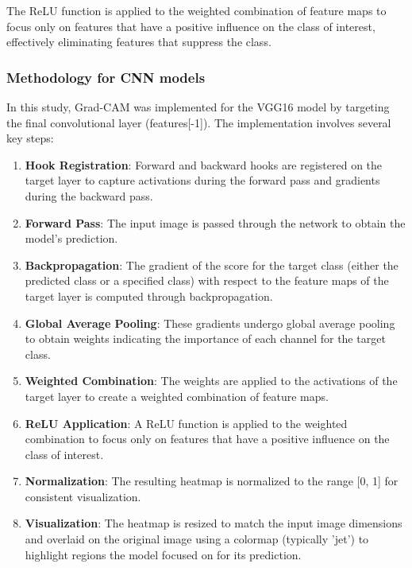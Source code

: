\documentclass[a4paper,12pt]{report}
\begin{document}
The ReLU function is applied to the weighted combination of feature maps to focus only on features that have a positive influence on the class of interest, effectively eliminating features that suppress the class.

\subsubsection{Methodology for CNN models}

In this study, Grad-CAM was implemented for the VGG16 model by targeting the final convolutional layer (features[-1]). The implementation involves several key steps:

\begin{enumerate}
    \item \textbf{Hook Registration}: Forward and backward hooks are registered on the target layer to capture activations during the forward pass and gradients during the backward pass.
    
    \item \textbf{Forward Pass}: The input image is passed through the network to obtain the model's prediction.
    
    \item \textbf{Backpropagation}: The gradient of the score for the target class (either the predicted class or a specified class) with respect to the feature maps of the target layer is computed through backpropagation.
    
    \item \textbf{Global Average Pooling}: These gradients undergo global average pooling to obtain weights indicating the importance of each channel for the target class.
    
    \item \textbf{Weighted Combination}: The weights are applied to the activations of the target layer to create a weighted combination of feature maps.
    
    \item \textbf{ReLU Application}: A ReLU function is applied to the weighted combination to focus only on features that have a positive influence on the class of interest.
    
    \item \textbf{Normalization}: The resulting heatmap is normalized to the range [0, 1] for consistent visualization.
    
    \item \textbf{Visualization}: The heatmap is resized to match the input image dimensions and overlaid on the original image using a colormap (typically 'jet') to highlight regions the model focused on for its prediction.
\end{enumerate}
\end{document}
